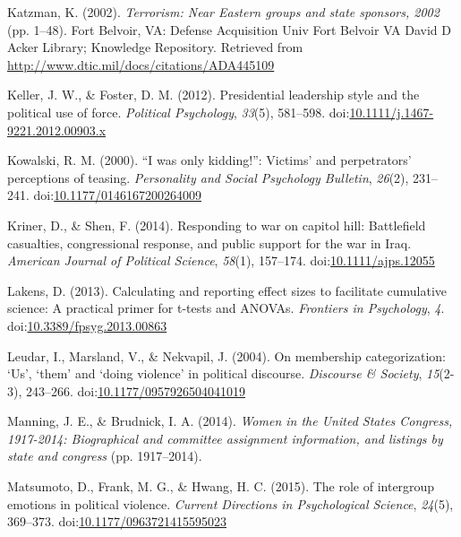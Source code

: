 \documentclass[english,man]{apa6}
\theoremstyle{definition}
\theoremstyle{definition}
\theoremstyle{definition}
\theoremstyle{remark}
\begin{document}
\hypertarget{ref-Katzman2002}{}
Katzman, K. (2002). \emph{Terrorism: Near Eastern groups and state
sponsors, 2002} (pp. 1--48). Fort Belvoir, VA: Defense Acquisition Univ
Fort Belvoir VA David D Acker Library; Knowledge Repository. Retrieved
from \url{http://www.dtic.mil/docs/citations/ADA445109}

\hypertarget{ref-Keller2012}{}
Keller, J. W., \& Foster, D. M. (2012). Presidential leadership style
and the political use of force. \emph{Political Psychology},
\emph{33}(5), 581--598.
doi:\href{https://doi.org/10.1111/j.1467-9221.2012.00903.x}{10.1111/j.1467-9221.2012.00903.x}

\hypertarget{ref-Kowalski2000}{}
Kowalski, R. M. (2000). ``I was only kidding!'': Victims' and
perpetrators' perceptions of teasing. \emph{Personality and Social
Psychology Bulletin}, \emph{26}(2), 231--241.
doi:\href{https://doi.org/10.1177/0146167200264009}{10.1177/0146167200264009}

\hypertarget{ref-Kriner2014}{}
Kriner, D., \& Shen, F. (2014). Responding to war on capitol hill:
Battlefield casualties, congressional response, and public support for
the war in Iraq. \emph{American Journal of Political Science},
\emph{58}(1), 157--174.
doi:\href{https://doi.org/10.1111/ajps.12055}{10.1111/ajps.12055}

\hypertarget{ref-Lakens2013}{}
Lakens, D. (2013). Calculating and reporting effect sizes to facilitate
cumulative science: A practical primer for t-tests and ANOVAs.
\emph{Frontiers in Psychology}, \emph{4}.
doi:\href{https://doi.org/10.3389/fpsyg.2013.00863}{10.3389/fpsyg.2013.00863}

\hypertarget{ref-Leudar2004}{}
Leudar, I., Marsland, V., \& Nekvapil, J. (2004). On membership
categorization: `Us', `them' and `doing violence' in political
discourse. \emph{Discourse \& Society}, \emph{15}(2-3), 243--266.
doi:\href{https://doi.org/10.1177/0957926504041019}{10.1177/0957926504041019}

\hypertarget{ref-Manning2014}{}
Manning, J. E., \& Brudnick, I. A. (2014). \emph{Women in the United
States Congress, 1917-2014: Biographical and committee assignment
information, and listings by state and congress} (pp. 1917--2014).

\hypertarget{ref-Matsumoto2015}{}
Matsumoto, D., Frank, M. G., \& Hwang, H. C. (2015). The role of
intergroup emotions in political violence. \emph{Current Directions in
Psychological Science}, \emph{24}(5), 369--373.
doi:\href{https://doi.org/10.1177/0963721415595023}{10.1177/0963721415595023}
\end{document}
